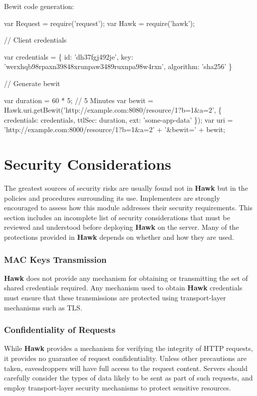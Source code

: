 Bewit code generation\+:


\begin{DoxyCode}
var Request = require('request');
var Hawk = require('hawk');


// Client credentials

var credentials = \{
    id: 'dh37fgj492je',
    key: 'werxhqb98rpaxn39848xrunpaw3489ruxnpa98w4rxn',
    algorithm: 'sha256'
\}

// Generate bewit

var duration = 60 * 5;      // 5 Minutes
var bewit = Hawk.uri.getBewit('http://example.com:8080/resource/1?b=1&a=2', \{ credentials: credentials,
       ttlSec: duration, ext: 'some-app-data' \});
var uri = 'http://example.com:8000/resource/1?b=1&a=2' + '&bewit=' + bewit;
\end{DoxyCode}


\section*{Security Considerations}

The greatest sources of security risks are usually found not in {\bfseries Hawk} but in the policies and procedures surrounding its use. Implementers are strongly encouraged to assess how this module addresses their security requirements. This section includes an incomplete list of security considerations that must be reviewed and understood before deploying {\bfseries Hawk} on the server. Many of the protections provided in {\bfseries Hawk} depends on whether and how they are used.

\subsubsection*{M\+AC Keys Transmission}

{\bfseries Hawk} does not provide any mechanism for obtaining or transmitting the set of shared credentials required. Any mechanism used to obtain {\bfseries Hawk} credentials must ensure that these transmissions are protected using transport-\/layer mechanisms such as T\+LS.

\subsubsection*{Confidentiality of Requests}

While {\bfseries Hawk} provides a mechanism for verifying the integrity of H\+T\+TP requests, it provides no guarantee of request confidentiality. Unless other precautions are taken, eavesdroppers will have full access to the request content. Servers should carefully consider the types of data likely to be sent as part of such requests, and employ transport-\/layer security mechanisms to protect sensitive resources.

